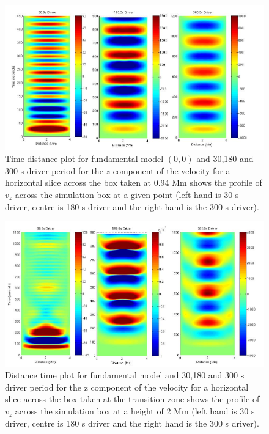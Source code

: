 \documentclass[authoryear,final,1p]{elsarticle}
\begin{document}
\begin{figure}[h]
\includegraphics[scale=0.4]{images/fig5_dt_30_180_300_0_horiz_p94Mm.jpg}
\caption{Time-distance plot for fundamental model $(0,0)$  and 30,180 and 300 s driver period for the $z$ component of the velocity for a horizontal slice across the box  taken at 0.94 Mm shows  the profile of $ v_{z}$ across the simulation box at a given point (left hand is 30 s driver, centre is 180 s driver and the right hand is the 300 s driver). }
\label{Fig4}
\end{figure}


\begin{figure}[h]
\includegraphics[scale=0.4]{images/fig6_dt_30_180_300_0_horiz_2Mm.jpg}
\caption{Distance time plot for fundamental model and 30,180 and 300 s driver period for the z component of the velocity for a horizontal slice across the box  taken at the transition zone shows  the profile of $v_{z}$ across the simulation box at a height of 2 Mm (left hand is 30 s driver, centre is 180 s driver and the right hand is the 300 s driver). }
\label{Fig5}
\end{figure}
\end{document}
